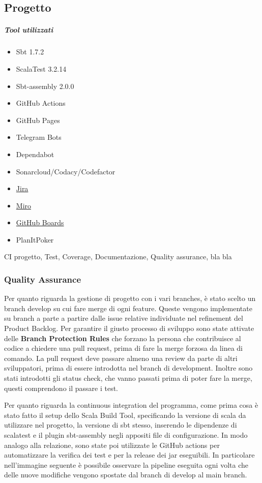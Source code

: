     \subsection{Progetto}
        \subparagraph{Tool utilizzati}
        \begin{itemize}
            \item Sbt 1.7.2
            \item ScalaTest 3.2.14
            \item Sbt-assembly 2.0.0
            \item GitHub Actions
            \item GitHub Pages
            \item Telegram Bots
            \item Dependabot
            \item Sonarcloud/Codacy/Codefactor
            \item \href{https://riccardo-omiccioli.atlassian.net/jira/software/projects/IQ/boards/1/roadmap}{Jira}
            \item \href{https://miro.com/app/board/uXjVPN93uLs=/?share_link_id=56431555728}{Miro}
            \item \href{https://github.com/orgs/ISIQuiz/projects/3}{GitHub Boards}
            \item PlanItPoker \cite{planitpoker}
        \end{itemize}
    CI progetto, Test, Coverage, Documentazione, Quality assurance, bla bla

        \subsubsection{Quality Assurance}
        Per quanto riguarda la gestione di progetto con i vari branches, è stato scelto un branch develop su cui fare merge di ogni feature. Queste vengono implementate su branch a parte a partire dalle issue relative individuate nel refinement del Product Backlog. 
        Per garantire il giusto processo di sviluppo sono state attivate delle \textbf{Branch Protection Rules} che forzano la persona che contribuisce al codice a chiedere una pull request, prima di fare la merge forzosa da linea di comando. La pull request deve passare almeno una review da parte di altri sviluppatori, prima di essere introdotta nel branch di development. Inoltre sono stati introdotti gli status check, che vanno passati prima di poter fare la merge, questi comprendono il passare i test. 
        
    Per quanto riguarda la continuous integration del programma, come prima cosa è stato fatto il setup dello Scala Build Tool, specificando la versione di scala da utilizzare nel progetto, la versione di sbt stesso, inserendo le dipendenze di scalatest e il plugin sbt-assembly negli appositi file di configurazione. In modo analogo alla relazione, sono state poi utilizzate le GitHub actions per automatizzare la verifica dei test e per la release dei jar eseguibili. In particolare nell'immagine seguente è possibile osservare la pipeline eseguita ogni volta che delle nuove modifiche vengono spostate dal branch di develop al main branch.

